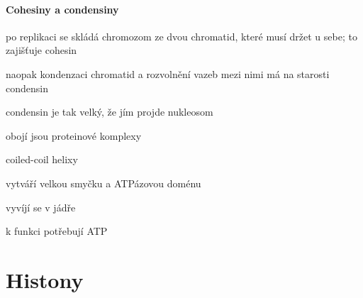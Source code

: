 \documentclass[DIV=8]{scrreprt}
\begin{document}
\paragraph{Cohesiny a condensiny}
\begin{myItemize}[nosep]
    \item po replikaci se skládá chromozom ze dvou chromatid, které musí držet u sebe; to zajišťuje cohesin
    \item naopak kondenzaci chromatid a rozvolnění vazeb mezi nimi má na starosti condensin
\begin{myItemize}[nosep]
    \item condensin je tak velký, že jím projde nukleosom
\end{myItemize}

    \item obojí jsou proteinové komplexy
\begin{myItemize}[nosep]
    \item coiled-coil helixy
    \item vytváří velkou smyčku a ATPázovou doménu
\end{myItemize}

    \item vyvíjí se v jádře
    \item k funkci potřebují ATP
\end{myItemize}



\section{Histony} \label{Histony} \FloatBarrier
\end{document}
